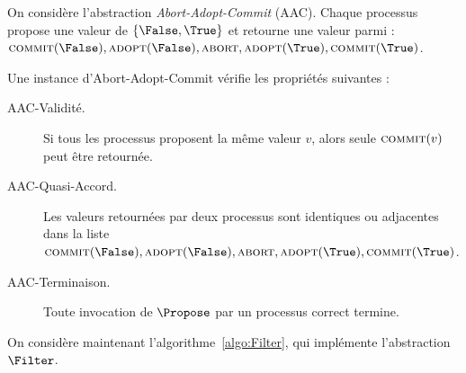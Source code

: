 
\begingroup

\newcommand\Adopt{\textup{\textsc{adopt}}}
\newcommand\Abort{\textup{\textsc{abort}}}
\newcommand\Commit{\textup{\textsc{commit}}}

\begin{exercice}

  On considère l'abstraction \emph{Abort-Adopt-Commit} (AAC).
  Chaque processus propose une valeur de $\{\False,\True\}$ et retourne une valeur parmi :
  $\Commit(\False), \Adopt(\False), \Abort, \Adopt(\True), \Commit(\True)$.

  \begin{definition}
    Une instance d'Abort-Adopt-Commit vérifie les propriétés suivantes :
    \begin{description}
    \item[AAC-Validité.]
      Si tous les processus proposent la même valeur $v$, alors
      seule $\Commit(v)$ peut être retournée.
    \item[AAC-Quasi-Accord.]
      Les valeurs retournées par deux processus sont identiques ou adjacentes
      dans la liste $\Commit(\False), \Adopt(\False), \Abort, \Adopt(\True), \Commit(\True)$.
    \item[AAC-Terminaison.]
      Toute invocation de $\Propose$ par un processus correct termine.
    \end{description}
  \end{definition}
  
  On considère maintenant l'algorithme~\ref{algo:Filter}, qui implémente l'abstraction $\Filter$.

  \begin{algorithm}[H]
    \nl {}
    \caption{Abstraction \textsc{filter}}
    \label{algo:Filter}
  \end{algorithm}

  \begin{questions}


\end{questions}
\end{exercice}
